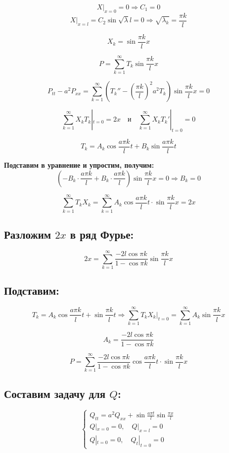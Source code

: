 \documentclass[a4paper,12pt]{article}
\begin{document}
$$X|_{x=0} = 0 \Rightarrow C_1 = 0$$
$$X|_{x=l} = C_2 \sin \sqrt{\lambda} l = 0 \Rightarrow \sqrt{\lambda_k} = \frac{\pi k}{l}$$

$$X_k = \sin \frac{\pi k}{l} x$$

$$P = \sum_{k=1}^\infty T_k \sin \frac{\pi k}{l} x$$

$$P_{tt} - a^2 P_{xx} = \sum_{k=1}^\infty \left( T_k'' - \left( \frac{\pi k}{l} \right)^2 a^2 T_k \right) \sin \frac{\pi k}{l} x = 0$$

$$\sum_{k=1}^\infty X_k T_k|_{t=0} = 2x
\quad \text{и} \quad
\sum_{k=1}^\infty X_k T_k'|_{t=0} = 0$$

$$T_k = A_k \cos \frac{a \pi k}{l} t + B_k \sin \frac{a \pi k}{l} t$$

\textbf{Подставим в уравнение и упростим, получим:}
$$\left( -B_k \cdot \frac{a \pi k}{l} + B_k \cdot \frac{a \pi k}{l} \right) \sin \frac{\pi k}{l} x = 0 \Rightarrow B_k = 0$$

$$\sum_{k=1}^\infty T_k X_k = \sum_{k=1}^\infty A_k \cos \frac{a \pi k}{l} t \cdot \sin \frac{\pi k}{l} x = 2x$$

\subsection*{Разложим $2x$ в ряд Фурье:}

$$2x = \sum_{k=1}^\infty \frac{-2l \cos \pi k}{1 - \cos \pi k} \sin \frac{\pi k}{l} x$$

\subsection*{Подставим:}

$$T_k = A_k \cos \frac{a \pi k}{l} t + \sin \frac{\pi k}{l} t
\Rightarrow
\sum_{k=1}^\infty T_k X_k|_{t=0} = \sum_{k=1}^\infty A_k \sin \frac{\pi k}{l} x$$

$$A_k = \frac{-2l \cos \pi k}{1 - \cos \pi k}$$

$$P = \sum_{k=1}^\infty \frac{-2l \cos \pi k}{1 - \cos \pi k} \cos \frac{a \pi k}{l} t \cdot \sin \frac{\pi k}{l} x$$

\subsection*{Составим задачу для $Q$:}

$$\begin{cases}
Q_{tt} = a^2 Q_{xx} + \sin \frac{a \pi t}{l} \sin \frac{\pi x}{l} \\
Q|_{x=0} = 0, \quad Q|_{x=l} = 0 \\
Q|_{t=0} = 0, \quad Q_t|_{t=0} = 0
\end{cases}$$
\end{document}
